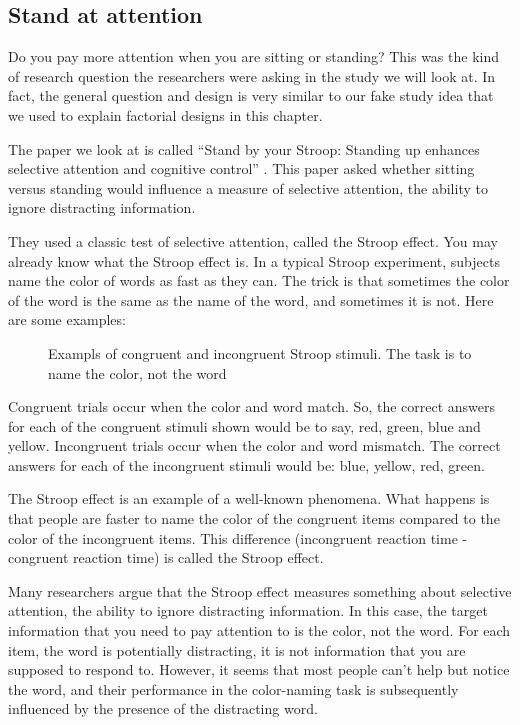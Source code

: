 \documentclass[
]{book}
\makeatletter
\newcommand*\pandocbounded[1]{%
  \sbox\pandoc@box{#1}%
  \Gscale@div\@tempa{\textheight}{\dimexpr\ht\pandoc@box+\dp\pandoc@box\relax}%
  \Gscale@div\@tempb{\linewidth}{\wd\pandoc@box}%
  \ifdim\@tempb\p@<\@tempa\p@\let\@tempa\@tempb\fi%
  \ifdim\@tempa\p@<\p@\scalebox{\@tempa}{\usebox\pandoc@box}%
  \else\usebox{\pandoc@box}%
  \fi%
}
\makeatother
\begin{document}
\subsection{Stand at attention}\label{stand-at-attention}

Do you pay more attention when you are sitting or standing? This was the kind of research question the researchers were asking in the study we will look at. In fact, the general question and design is very similar to our fake study idea that we used to explain factorial designs in this chapter.

The paper we look at is called ``Stand by your Stroop: Standing up enhances selective attention and cognitive control'' \citep{rosenbaum2017stand}. This paper asked whether sitting versus standing would influence a measure of selective attention, the ability to ignore distracting information.

They used a classic test of selective attention, called the Stroop effect. You may already know what the Stroop effect is. In a typical Stroop experiment, subjects name the color of words as fast as they can. The trick is that sometimes the color of the word is the same as the name of the word, and sometimes it is not. Here are some examples:

\begin{figure}
\centering
\pandocbounded{\texttt{[image: figures/Stroop.png]}}
\caption{\label{fig:9stroop}Exampls of congruent and incongruent Stroop stimuli. The task is to name the color, not the word}
\end{figure}

Congruent trials occur when the color and word match. So, the correct answers for each of the congruent stimuli shown would be to say, red, green, blue and yellow. Incongruent trials occur when the color and word mismatch. The correct answers for each of the incongruent stimuli would be: blue, yellow, red, green.

The Stroop effect is an example of a well-known phenomena. What happens is that people are faster to name the color of the congruent items compared to the color of the incongruent items. This difference (incongruent reaction time - congruent reaction time) is called the Stroop effect.

Many researchers argue that the Stroop effect measures something about selective attention, the ability to ignore distracting information. In this case, the target information that you need to pay attention to is the color, not the word. For each item, the word is potentially distracting, it is not information that you are supposed to respond to. However, it seems that most people can't help but notice the word, and their performance in the color-naming task is subsequently influenced by the presence of the distracting word.
\end{document}

